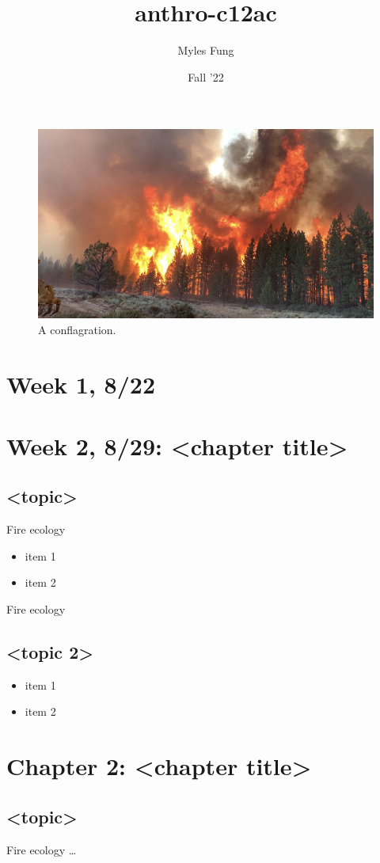 \documentclass[a4paper]{article}
\title{anthro-c12ac}
\author{Myles Fung}
\date{Fall '22}
\begin{document}
\begin{figure}
\centering
\includegraphics[width=.5\textwidth]{conflagration.jpeg}
\caption{\label{fig:conflagration}A conflagration.}
\end{figure}

\maketitle


\section{Week 1, 8/22}

\subsection{}


\section{Week 2, 8/29: <chapter title>}

\subsection{<topic>}
Fire ecology 

\begin{itemize}
    \item item 1
    \item item 2
\end{itemize}

Fire ecology



\subsection{<topic 2>}

\begin{itemize}
    \item item 1
    \item item 2
\end{itemize}


\section{Chapter 2: <chapter title>}

\subsection{<topic>}
Fire ecology \dots 
\end{document}
